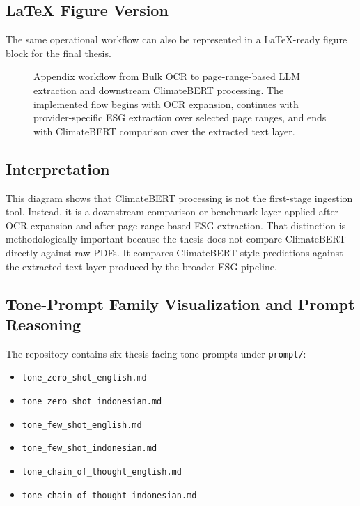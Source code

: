 \subsection{LaTeX Figure Version}\label{latex-figure-version}

The same operational workflow can also be represented in a LaTeX-ready figure block for the final thesis.

\begin{figure}[ht]
\begin{center}
\end{center}
\caption{Appendix workflow from Bulk OCR to page-range-based LLM extraction and downstream ClimateBERT processing. The implemented flow begins with OCR expansion, continues with provider-specific ESG extraction over selected page ranges, and ends with ClimateBERT comparison over the extracted text layer.}
\label{fig:appendix_bulkocr_llm_climatebert_workflow}
\end{figure}

\subsection{Interpretation}\label{interpretation}

This diagram shows that ClimateBERT processing is not the first-stage ingestion tool. Instead, it is a downstream comparison or benchmark layer applied after OCR expansion and after page-range-based ESG extraction. That distinction is methodologically important because the thesis does not compare ClimateBERT directly against raw PDFs. It compares ClimateBERT-style predictions against the extracted text layer produced by the broader ESG pipeline.

\subsection{Tone-Prompt Family Visualization and Prompt Reasoning}\label{tone-prompt-family-visualization-and-prompt-reasoning}

The repository contains six thesis-facing tone prompts under \texttt{prompt/}:

\begin{itemize}
\tightlist
\item
  \texttt{tone\_zero\_shot\_english.md}
\item
  \texttt{tone\_zero\_shot\_indonesian.md}
\item
  \texttt{tone\_few\_shot\_english.md}
\item
  \texttt{tone\_few\_shot\_indonesian.md}
\item
  \texttt{tone\_chain\_of\_thought\_english.md}
\item
  \texttt{tone\_chain\_of\_thought\_indonesian.md}
\end{itemize}


